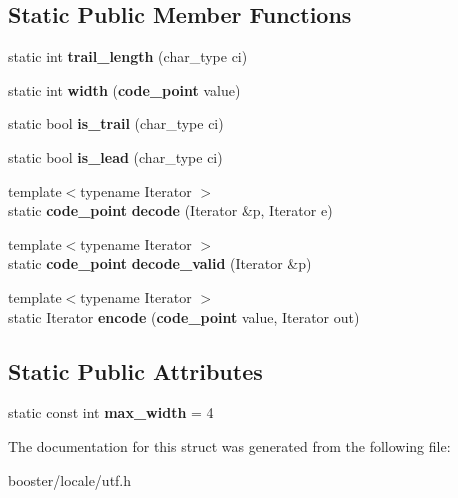 \subsection*{Static Public Member Functions}
\begin{DoxyCompactItemize}
\item 
static int {\bfseries trail\-\_\-length} (char\-\_\-type ci)\label{structbooster_1_1locale_1_1utf_1_1utf__traits_3_01CharType_00_011_01_4_a201813f53f743fd2328cc4bd2b3f3f83}

\item 
static int {\bfseries width} ({\bf code\-\_\-point} value)\label{structbooster_1_1locale_1_1utf_1_1utf__traits_3_01CharType_00_011_01_4_a932c4075e8acc4fe889d12a84eae0dfb}

\item 
static bool {\bfseries is\-\_\-trail} (char\-\_\-type ci)\label{structbooster_1_1locale_1_1utf_1_1utf__traits_3_01CharType_00_011_01_4_ae50437a7bf1273f744ae85b3f78353e9}

\item 
static bool {\bfseries is\-\_\-lead} (char\-\_\-type ci)\label{structbooster_1_1locale_1_1utf_1_1utf__traits_3_01CharType_00_011_01_4_abefe6df4cc063ebc388c121d039eb64c}

\item 
{\footnotesize template$<$typename Iterator $>$ }\\static {\bf code\-\_\-point} {\bfseries decode} (Iterator \&p, Iterator e)\label{structbooster_1_1locale_1_1utf_1_1utf__traits_3_01CharType_00_011_01_4_a0c3d27f2eac62e5377df448b37eea908}

\item 
{\footnotesize template$<$typename Iterator $>$ }\\static {\bf code\-\_\-point} {\bfseries decode\-\_\-valid} (Iterator \&p)\label{structbooster_1_1locale_1_1utf_1_1utf__traits_3_01CharType_00_011_01_4_a6c9a0f41197269ce0eb0ddc05ff925de}

\item 
{\footnotesize template$<$typename Iterator $>$ }\\static Iterator {\bfseries encode} ({\bf code\-\_\-point} value, Iterator out)\label{structbooster_1_1locale_1_1utf_1_1utf__traits_3_01CharType_00_011_01_4_a0e9c5ad8639e94da1a3e28cc867c9cce}

\end{DoxyCompactItemize}
\subsection*{Static Public Attributes}
\begin{DoxyCompactItemize}
\item 
static const int {\bfseries max\-\_\-width} = 4\label{structbooster_1_1locale_1_1utf_1_1utf__traits_3_01CharType_00_011_01_4_a1652d965a19800f3e0628eddd62bcb7d}

\end{DoxyCompactItemize}


The documentation for this struct was generated from the following file\-:\begin{DoxyCompactItemize}
\item 
booster/locale/utf.\-h\end{DoxyCompactItemize}

